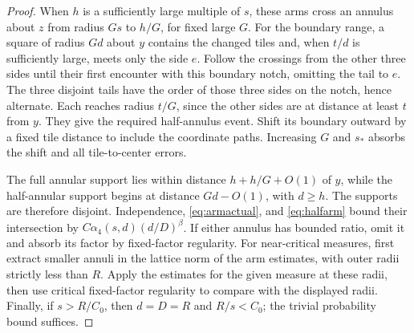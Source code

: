 \begin{proof}
When $h$ is a sufficiently large multiple of $s$, these arms cross an annulus about $z$ from radius $Gs$ to $h/G$, for fixed large $G$. For the boundary range, a square of radius $Gd$ about $y$ contains the changed tiles and, when $t/d$ is sufficiently large, meets only the side $e$. Follow the crossings from the other three sides until their first encounter with this boundary notch, omitting the tail to $e$. The three disjoint tails have the order of those three sides on the notch, hence alternate. Each reaches radius $t/G$, since the other sides are at distance at least $t$ from $y$. They give the required half-annulus event. Shift its boundary outward by a fixed tile distance to include the coordinate paths. Increasing $G$ and $s_*$ absorbs the shift and all tile-to-center errors.

The full annular support lies within distance $h+h/G+O(1)$ of $y$, while the half-annular support begins at distance $Gd-O(1)$, with $d\ge h$. The supports are therefore disjoint. Independence, \eqref{eq:armactual}, and \eqref{eq:halfarm} bound their intersection by $C\alpha_4(s,d)(d/D)^\beta$. If either annulus has bounded ratio, omit it and absorb its factor by fixed-factor regularity. For near-critical measures, first extract smaller annuli in the lattice norm of the arm estimates, with outer radii strictly less than $R$. Apply the estimates for the given measure at these radii, then use critical fixed-factor regularity to compare with the displayed radii. Finally, if $s>R/C_0$, then $d=D=R$ and $R/s<C_0$; the trivial probability bound suffices.
\end{proof}

